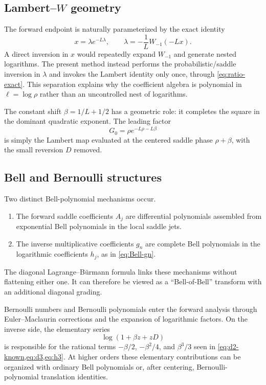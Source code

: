 \documentclass[11pt,oneside]{article}
\numberwithin{equation}{section}
\theoremstyle{definition}
\theoremstyle{remark}
\newcommand{\Gzero}{G_0}
\begin{document}
\subsection{\texorpdfstring{Lambert--$W$ geometry}{Lambert W geometry}}
The forward endpoint is naturally parameterized by the exact identity
\begin{equation}
 x=\lambda e^{-L\lambda},
 \qquad
 \lambda=-\frac1L W_{-1}(-Lx).
 \label{eq:Lambert-geometry}
\end{equation}
A direct inversion in $x$ would repeatedly expand $W_{-1}$ and generate nested logarithms.  The present method instead performs the probabilistic/saddle inversion in $\lambda$ and invokes the Lambert identity only once, through \cref{eq:ratio-exact}.  This separation explains why the coefficient algebra is polynomial in $\ell=\log\rho$ rather than an uncontrolled nest of logarithms.

The constant shift $\beta=1/L+1/2$ has a geometric role: it completes the square in the dominant quadratic exponent.  The leading factor
\begin{equation}
 \Gzero=\rho e^{-L\rho-L\beta}
 \label{eq:G0-Lambert}
\end{equation}
is simply the Lambert map evaluated at the centered saddle phase $\rho+\beta$, with the small reversion $D$ removed.

\subsection{Bell and Bernoulli structures}
Two distinct Bell-polynomial mechanisms occur.
\begin{enumerate}
\item The forward saddle coefficients $A_j$ are differential polynomials assembled from exponential Bell polynomials in the local saddle jets.
\item The inverse multiplicative coefficients $g_n$ are complete Bell polynomials in the logarithmic coefficients $h_j$, as in \cref{eq:Bell-gn}.
\end{enumerate}
The diagonal Lagrange--B\"urmann formula links these mechanisms without flattening either one.  It can therefore be viewed as a ``Bell-of-Bell'' transform with an additional diagonal grading.

Bernoulli numbers and Bernoulli polynomials enter the forward analysis through Euler--Maclaurin corrections and the expansion of logarithmic factors.  On the inverse side, the elementary series
\begin{equation}
 \log(1+\beta z+zD)
 \label{eq:inverse-log-factor}
\end{equation}
is responsible for the rational terms $-\beta/2$, $-\beta^2/4$, and $\beta^3/3$ seen in \cref{eq:d2-known,eq:d3,eq:h3}.  At higher orders these elementary contributions can be organized with ordinary Bell polynomials or, after centering, Bernoulli-polynomial translation identities.
\end{document}
